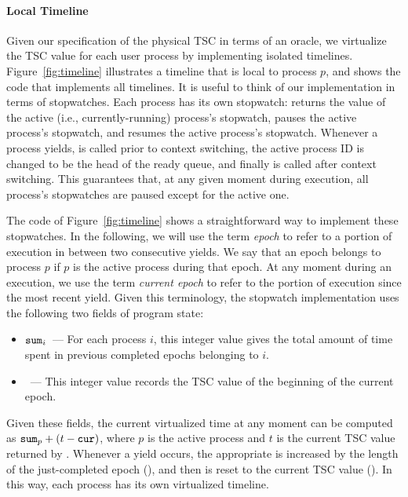 \paragraph{Local Timeline}
Given our specification of the physical TSC in terms of an oracle,
we virtualize the TSC value for each user process by implementing
isolated timelines. Figure~\ref{fig:timeline} illustrates a
timeline that is local to process $p$, and shows the code that
implements all timelines. It is useful to think of our
implementation in terms of stopwatches. Each process has its
own stopwatch: \gett{} returns the value of the active
(i.e., currently-running) process's stopwatch, \stopt{}
pauses the active process's stopwatch, and \startt{} resumes
the active process's stopwatch. Whenever a process yields,
\stopt{} is called prior to context switching, the active 
process ID is changed to be
the head of the ready queue, and finally \startt{} is called after context 
switching. This
guarantees that, at any given moment during execution, all 
process's stopwatches are paused except for the active one.

The code of Figure~\ref{fig:timeline} shows a straightforward
way to implement these stopwatches. In the following, we will
use the term \emph{epoch} to refer to a portion of execution
in between two consecutive yields. We say that an epoch belongs
to process $p$ if $p$ is the active process during that epoch.
At any moment during an execution, we use the term 
\emph{current epoch} to refer to the portion of execution since
the most recent yield. Given this terminology, the stopwatch 
implementation uses the following two fields of program state:
\begin{itemize}
\item $\text{\tt{sum}}_i$~--- For each process $i$, this integer value 
gives the total amount of time spent in previous completed epochs
belonging to $i$.
\item {}~--- This integer value records the TSC value of the
beginning of the current epoch.
\end{itemize}
Given these fields, the current virtualized time at any moment
can be computed as $\text{\tt{sum}}_p + (t - \text{\tt{cur}})$, where $p$ is the
active process and $t$ is the current TSC value returned by . 
Whenever a yield occurs, the appropriate  is 
increased by the length of the just-completed epoch (), and 
then  is reset to the current TSC value (). In this 
way, each process has its own virtualized timeline.

